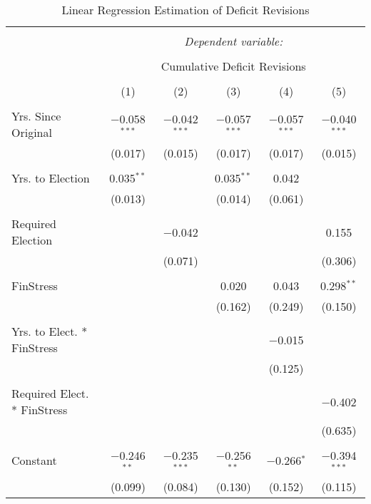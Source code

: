 
\begin{table}[!htbp] \centering 
  \caption{Linear Regression Estimation of Deficit Revisions} 
  \label{deficit_results} 
\tiny 
\begin{tabular}{@{\extracolsep{5pt}}lccccc} 
\\[-1.8ex]\hline 
\hline \\[-1.8ex] 
 & \multicolumn{5}{c}{\textit{Dependent variable:}} \\ 
\cline{2-6} 
\\[-1.8ex] & \multicolumn{5}{c}{Cumulative Deficit Revisions} \\ 
\\[-1.8ex] & (1) & (2) & (3) & (4) & (5)\\ 
\hline \\[-1.8ex] 
 Yrs. Since Original & $-$0.058$^{***}$ & $-$0.042$^{***}$ & $-$0.057$^{***}$ & $-$0.057$^{***}$ & $-$0.040$^{***}$ \\ 
  & (0.017) & (0.015) & (0.017) & (0.017) & (0.015) \\ 
  & & & & & \\ 
 Yrs. to Election & 0.035$^{**}$ &  & 0.035$^{**}$ & 0.042 &  \\ 
  & (0.013) &  & (0.014) & (0.061) &  \\ 
  & & & & & \\ 
 Required Election &  & $-$0.042 &  &  & 0.155 \\ 
  &  & (0.071) &  &  & (0.306) \\ 
  & & & & & \\ 
 FinStress &  &  & 0.020 & 0.043 & 0.298$^{**}$ \\ 
  &  &  & (0.162) & (0.249) & (0.150) \\ 
  & & & & & \\ 
 Yrs. to Elect. * FinStress &  &  &  & $-$0.015 &  \\ 
  &  &  &  & (0.125) &  \\ 
  & & & & & \\ 
 Required Elect. * FinStress &  &  &  &  & $-$0.402 \\ 
  &  &  &  &  & (0.635) \\ 
  & & & & & \\ 
 Constant & $-$0.246$^{**}$ & $-$0.235$^{***}$ & $-$0.256$^{**}$ & $-$0.266$^{*}$ & $-$0.394$^{***}$ \\ 
  & (0.099) & (0.084) & (0.130) & (0.152) & (0.115) \\ 

\end{tabular}
\end{table}
